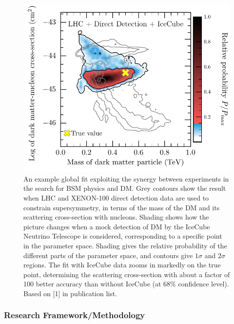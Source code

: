 \documentclass[10pt,oneside,twocolumn,a4paper]{article}
\begin{document}
\begin{figure}[b!]
  \centering
  \includegraphics[width=0.93\linewidth]{URF_Proposal_Fig_1}
  \caption{An example global fit exploiting the synergy between experiments in the search for BSM physics and DM.  Grey contours show the result when LHC and XENON-100 direct detection data are used to constrain supersymmetry, in terms of the mass of the DM and its scattering cross-section with nucleons.  Shading shows how the picture changes when a mock detection of DM by the IceCube Neutrino Telescope is considered, corresponding to a specific point in the parameter space.  Shading gives the relative probability of the different parts of the parameter space, and contours give $1\sigma$ and $2\sigma$ regions.  The fit with IceCube data zooms in markedly on the true point, determining the scattering cross-section with about a factor of 100 better accuracy than without IceCube (at 68\% confidence level).  Based on [1] in publication list.}
  \label{example}
\end{figure}

\subsubsection*{Research Framework/Methodology}
\end{document}
